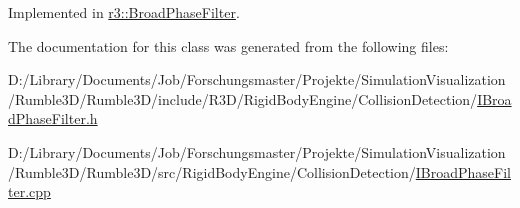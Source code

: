 Implemented in \mbox{\hyperlink{classr3_1_1_broad_phase_filter_a16b87610362f670906ca7d9a3251815f}{r3\+::\+Broad\+Phase\+Filter}}.



The documentation for this class was generated from the following files\+:\begin{DoxyCompactItemize}
\item 
D\+:/\+Library/\+Documents/\+Job/\+Forschungsmaster/\+Projekte/\+Simulation\+Visualization/\+Rumble3\+D/\+Rumble3\+D/include/\+R3\+D/\+Rigid\+Body\+Engine/\+Collision\+Detection/\mbox{\hyperlink{_i_broad_phase_filter_8h}{I\+Broad\+Phase\+Filter.\+h}}\item 
D\+:/\+Library/\+Documents/\+Job/\+Forschungsmaster/\+Projekte/\+Simulation\+Visualization/\+Rumble3\+D/\+Rumble3\+D/src/\+Rigid\+Body\+Engine/\+Collision\+Detection/\mbox{\hyperlink{_i_broad_phase_filter_8cpp}{I\+Broad\+Phase\+Filter.\+cpp}}\end{DoxyCompactItemize}
